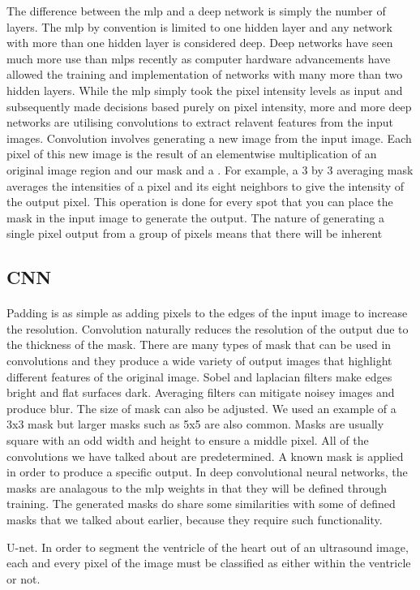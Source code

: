 \documentclass{article}
\begin{document}
\par
The difference between the mlp and a deep network is simply the number of layers. The mlp by convention is limited to one hidden layer and any network with more than one hidden layer is considered deep. Deep networks have seen much more use than mlps recently as computer hardware advancements have allowed the training and implementation of networks with many more than two hidden layers. While the mlp simply took the pixel intensity levels as input and subsequently made decisions based purely on pixel intensity, more and more deep networks are utilising convolutions to extract relavent features from the input images. Convolution involves generating a new image from the input image. Each pixel of this new image is the result of an elementwise multiplication of an original image region and our mask and a . For example, a 3 by 3 averaging mask averages the intensities of a pixel and its eight neighbors to give the intensity of the output pixel. This operation is done for every spot that you can place the mask in the input image to generate the output. The nature of generating a single pixel output from a group of pixels means that there will be inherent
\subsection{CNN}
\paragraph{}

Padding is as simple as adding pixels to the edges of the input image to increase the resolution. Convolution naturally reduces the resolution of the output due to the thickness of the mask. There are many types of mask that can be used in convolutions and they produce a wide variety of output images that highlight different features of the original image. Sobel and laplacian filters make edges bright and flat surfaces dark. Averaging filters can mitigate noisey images and produce blur. The size of mask can also be adjusted. We used an example of a 3x3 mask but larger masks such as 5x5 are also common. Masks are usually square with an odd width and height to ensure a middle pixel. All of the convolutions we have talked about are predetermined. A known mask is applied in order to produce a specific output. In deep convolutional neural networks, the masks are analagous to the mlp weights in that they will be defined through training. The generated masks do share some similarities with some of defined masks that we talked about earlier, because they require such functionality.
\par
U-net.
In order to segment the ventricle of the heart out of an ultrasound image, each and every pixel of the image must be classified as either within the ventricle or not. 
\end{document}
